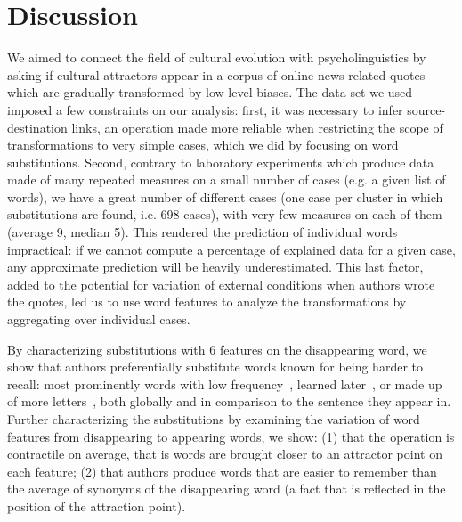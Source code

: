 \section{Discussion}

\begin{new}

We aimed to connect the field of cultural evolution with psycholinguistics by asking if cultural attractors appear in a corpus of online news-related quotes which are gradually transformed by low-level biases.
The data set we used imposed a few constraints on our analysis:
first, it was necessary to infer source-destination links, an operation made more reliable when restricting the scope of transformations to very simple cases, which we did by focusing on word substitutions.
Second, contrary to laboratory experiments which produce data made of many repeated measures on a small number of cases (\hbox{e.g.} a given list of words), we have a great number of different cases (one case per cluster in which substitutions are found, \hbox{i.e.} 698 cases), with very few measures on each of them (average 9, median 5).
This rendered the prediction of individual words impractical: if we cannot compute a percentage of explained data for a given case, any approximate prediction will be heavily underestimated.
This last factor, added to the potential for variation of external conditions when authors wrote the quotes, led us to use word features to analyze the transformations by aggregating over individual cases.

By characterizing substitutions with 6 features on the disappearing word, we show that authors preferentially substitute words known for being harder to recall:
most prominently words with low frequency~\citep{gregg_word_1976}, learned later~\citep{dewhurst_separate_1998}, or made up of more letters~\citep{nickels_dissociating_2004}, both globally and in comparison to the sentence they appear in.
Further characterizing the substitutions by examining the variation of word features from disappearing to appearing words, we show:
(1) that the operation is contractile on average, that is words are brought closer to an attractor point on each feature;
(2) that authors produce words that are easier to remember than the average of synonyms of the disappearing word (a fact that is reflected in the position of the attraction point).


\end{new}
